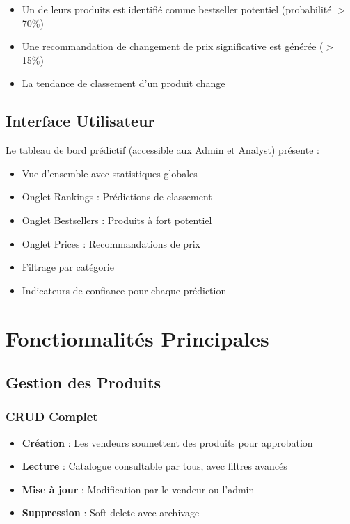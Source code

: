\documentclass[12pt,a4paper]{report}
\begin{document}
\begin{itemize}[noitemsep]
    \item Un de leurs produits est identifié comme bestseller potentiel (probabilité $>$ 70\%)
    \item Une recommandation de changement de prix significative est générée ($>$ 15\%)
    \item La tendance de classement d'un produit change
\end{itemize}

\section{Interface Utilisateur}

Le tableau de bord prédictif (accessible aux Admin et Analyst) présente :

\begin{itemize}[noitemsep]
    \item Vue d'ensemble avec statistiques globales
    \item Onglet Rankings : Prédictions de classement
    \item Onglet Bestsellers : Produits à fort potentiel
    \item Onglet Prices : Recommandations de prix
    \item Filtrage par catégorie
    \item Indicateurs de confiance pour chaque prédiction
\end{itemize}

\chapter{Fonctionnalités Principales}

\section{Gestion des Produits}

\subsection{CRUD Complet}

\begin{itemize}[noitemsep]
    \item \textbf{Création} : Les vendeurs soumettent des produits pour approbation
    \item \textbf{Lecture} : Catalogue consultable par tous, avec filtres avancés
    \item \textbf{Mise à jour} : Modification par le vendeur ou l'admin
    \item \textbf{Suppression} : Soft delete avec archivage
\end{itemize}
\end{document}

